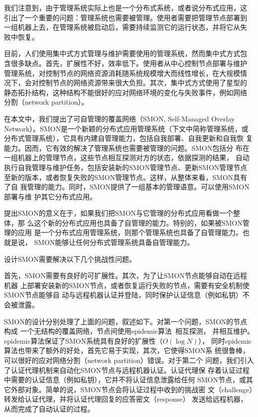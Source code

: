 我们注意到，由于管理系统实际上也是一个分布式系统，或者说分布式应用，这
引出了一个重要的问题：管理系统也需要被管理。使用者需要把管理节点部署到
一组机器上去，在管理系统被启动后，需要持续监测它的运行状态，并将它从失
败中恢复。


目前，人们使用集中式方式管理与维护需要使用的管理系统，然而集中式方式包
含很多缺点。首先，扩展性不好，效率低下。使用者从中心控制节点部署与维护
管理系统，对控制节点的网络资源消耗随系统规模增大而线性增长，在大规模情
况下，会对控制节点的网络资源带来很大负担。其次，集中式方式使用了星型的
静态拓扑结构，这种结构不能很好的应对网络环境的变化与失败事件，例如网络
分割（network partition）。


在本文中，我们提出了可自管理的覆盖网络（SMON, Self-Managed Overlay
Network）。SMON是一个新颖的分布式应用管理系统（下文中简称管理系统，或
分布式管理系统），它具有内建自管理能力，包括自我部署、自我更新和自我恢
复能力。因而，它有效的解决了管理系统也需要被管理的问题。SMON包括分
布在一组机器上的管理节点，这些节点相互探测对方的状态，依据探测的结果，
自动执行自我管理与维护任务，包括安装新的SMON管理节点、更新SMON管理节点
至新的版本，或者恢复失败的SMON管理节点。这样，从整体来看，SMON具有了自
我管理的能力。同时，SMON提供了一组基本的管理语意。可以使用SMON部署与维
护其它分布式应用。

提出SMON的意义在于，如果我们把SMON与它管理的分布式应用看做一个整体，那
么这个新的分布式应用也具备了自管理的能力。特别的，如果被SMON管理的应用
是一个分布式应用管理系统，则那个管理系统也具备了自管理能力。也就是说，
SMON能够让任何分布式管理系统具备自管理能力。

设计SMON需要解决以下几个挑战性问题。

首先，SMON需要有良好的可扩展性。其次，为了让SMON节点能够自动在远程机器
上部署安装新的SMON节点，或者恢复运行失败的节点，需要有安全机制使SMON节点能够自
动与远程机器认证并登陆，同时保护认证信息（例如私钥）不会被泄露。

SMON的设计分别处理了上面的问题，叙述如下。对第一个问题，SMON的节点构成
一个无结构的覆盖网络，节点间使用epidemic算法~\cite{Demers1987}相互探测，
并相互维护。epidemic算法保证了SMON系统具有良好的扩展性（$O(\log N)$），
同时epidemic算法也带来了额外的好处，首先它易于实现，其次，它使得SMON系
统很鲁棒，可以很好的应对网络分割（network partition）错误。对于第二个
问题，我们引入了认证代理机制来自动化SMON节点与远程机器认证。认证代理保
存着认证过程中需要的认证信息（例如私钥），它并不将认证信息泄露给任何
SMON节点，或其它外部对象。简单的说，SMON节点会将认证过程中收到的挑战密
文（challenge）转发给认证代理，并将认证代理回复的应答密文（response）
发送给远程机器，从而完成了自动认证的过程。

